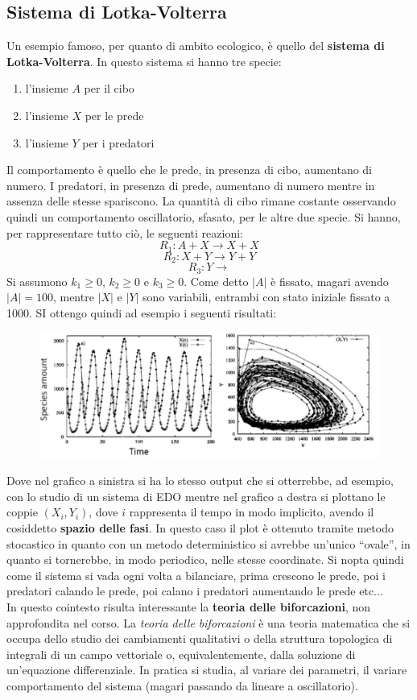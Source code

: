\documentclass[a4paper,12pt, oneside]{book}
\begin{document}
\subsection{Sistema di Lotka-Volterra}
Un esempio famoso, per quanto di ambito ecologico, è quello del \textbf{sistema
  di Lotka-Volterra}. In questo sistema si hanno tre specie:
\begin{enumerate}
  \item l'insieme $A$ per il cibo
  \item l'insieme $X$ per le prede
  \item l'insieme $Y$ per i predatori
\end{enumerate}
Il comportamento è quello che le prede, in presenza di cibo, aumentano di
numero. I predatori, in presenza di prede, aumentano di numero mentre in assenza
delle stesse spariscono. La quantità di cibo rimane costante osservando quindi
un comportamento oscillatorio, sfasato, per le altre due specie. Si hanno, per
rappresentare tutto ciò, le seguenti reazioni:
\[R_1:A+X\to X+X\]
\[R_2:X+Y\to Y+Y\]
\[R_3:Y\to\]
Si assumono $k_1\geq 0$, $k_2\geq 0$ e $k_3\geq 0$. Come detto $|A|$ è fissato,
magari avendo $|A|=100$, mentre $|X|$ e $|Y|$ sono variabili, entrambi con
stato iniziale fissato a 1000. SI ottengo quindi ad esempio i seguenti
risultati:
\begin{figure}[H]
  \centering
  \includegraphics[scale = 0.4]{img/volt.jpg}
\end{figure}
Dove nel grafico a sinistra si ha lo stesso output che si otterrebbe, ad
esempio, con lo studio di un sistema di EDO mentre nel grafico a destra si
plottano le coppie $(X_i, Y_i)$, dove $i$ rappresenta il tempo in modo
implicito, avendo il cosiddetto \textbf{spazio delle fasi}. In questo caso il
plot è ottenuto tramite metodo stocastico in quanto con un metodo deterministico
si avrebbe un'unico ``ovale'', in quanto si tornerebbe, in modo periodico, nelle
stesse coordinate. Si nopta quindi come il sistema si vada ogni volta a
bilanciare, prima crescono le prede, poi i predatori calando le prede, poi
calano i predatori aumentando le prede etc$\ldots$\\
In questo cointesto risulta interessante la \textbf{teoria delle biforcazioni},
non approfondita nel corso.
La \textit{teoria delle biforcazioni} è una teoria matematica che si occupa
dello studio dei cambiamenti qualitativi o della struttura topologica di
integrali di un campo vettoriale o, equivalentemente, dalla soluzione di
un'equazione differenziale. In pratica si studia, al variare dei parametri, il
variare comportamento del sistema (magari passando da lineare a oscillatorio).
\end{document}
